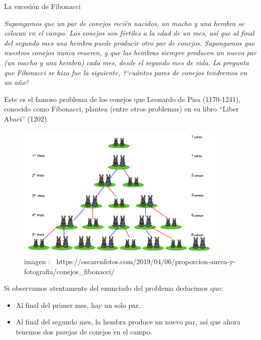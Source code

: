 \vspace{5mm}
\begin{myexampleblock}{La sucesión de Fibonacci}

\vspace{2mm} \emph{Supongamos que un par de conejos recién nacidos, un macho y una hembra se colocan en el campo. Los conejos son fértiles a la edad de un mes, así que al final del segundo mes una hembra puede producir otro par de conejos. Supongamos que nuestros conejos nunca mueren, y que las hembras siempre producen un nuevo par (un macho y una hembra) cada mes, desde el segundo mes de vida. La pregunta que Fibonacci se hizo fue la siguiente, ?`cuántos pares de conejos tendremos en un año?}

\vspace{4mm} \small{\textsf{Este es el famoso problema de los conejos que Leonardo de Pisa (1170-1241), conocido como Fibonacci, plantea (entre otros problemas) en su libro “Liber Abaci” (1202).}}

\begin{figure}[H]
	\centering
	\includegraphics[width=0.9\textwidth]{img-suc/suc01.png}
	\caption*{\scriptsize{imagen : $\ $ https://oscarenfotos.com/2019/04/06/proporcion-aurea-y-fotografia/conejos\_fibonacci/}}
	\end{figure}
 
\vspace{2mm} Si observamos atentamente del enunciado del problema deducimos que:
\vspace{-1mm}
\begin{itemize}
	
\vspace{-2mm}\item Al final del primer mes, hay un solo par.

\vspace{-2mm}\item Al final del segundo mes, la hembra produce un nuevo par, así que ahora
tenemos dos parejas de conejos en el campo.


\end{itemize}
\end{myexampleblock}
